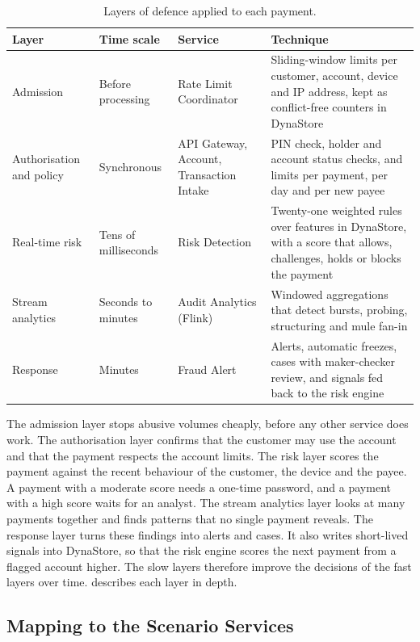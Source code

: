 \documentclass[11pt,a4paper]{article}
\begin{document}
\begin{table}[H]\centering\small
\caption{Layers of defence applied to each payment.}\label{tab:layers}
\begin{tabularx}{\linewidth}{@{}L{2.4cm}L{2.3cm}L{2.9cm}Y@{}}
\toprule
Layer & Time scale & Service & Technique \\
\midrule
Admission & Before processing & Rate Limit Coordinator & Sliding-window limits per customer, account, device and IP address, kept as conflict-free counters in DynaStore \\
Authorisation and policy & Synchronous & API Gateway, Account, Transaction Intake & PIN check, holder and account status checks, and limits per payment, per day and per new payee \\
Real-time risk & Tens of milliseconds & Risk Detection & Twenty-one weighted rules over features in DynaStore, with a score that allows, challenges, holds or blocks the payment \\
Stream analytics & Seconds to minutes & Audit Analytics (Flink) & Windowed aggregations that detect bursts, probing, structuring and mule fan-in \\
Response & Minutes & Fraud Alert & Alerts, automatic freezes, cases with maker-checker review, and signals fed back to the risk engine \\
\bottomrule
\end{tabularx}
\end{table}

The admission layer stops abusive volumes cheaply, before any other service does work. The authorisation layer confirms that the customer may use the account and that the payment respects the account limits. The risk layer scores the payment against the recent behaviour of the customer, the device and the payee. A payment with a moderate score needs a one-time password, and a payment with a high score waits for an analyst. The stream analytics layer looks at many payments together and finds patterns that no single payment reveals. The response layer turns these findings into alerts and cases. It also writes short-lived signals into DynaStore, so that the risk engine scores the next payment from a flagged account higher. The slow layers therefore improve the decisions of the fast layers over time.  describes each layer in depth.

\subsection{Mapping to the Scenario Services}
\label{sec:s17map}
\end{document}
